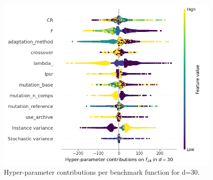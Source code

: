 \begin{figure}[t]
	\includegraphics[height=0.15\textheight,trim=60mm 0mm 0mm 0mm,clip]{de_img_new/img_summary_f24_d30.png}
\caption{Hyper-parameter contributions per benchmark function for d=30. \label{fig:shapxplaind30}}

\end{figure}

